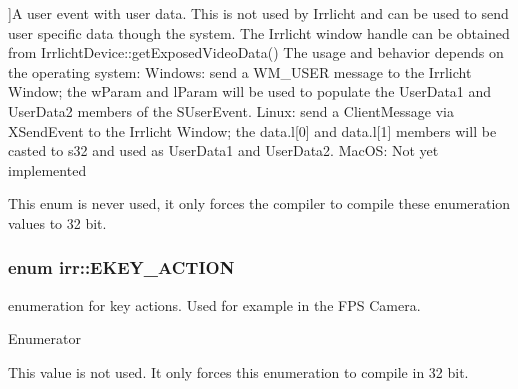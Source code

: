 \begin{Desc}
\begin{description}
{}]A user event with user data. This is not used by Irrlicht and can be used to send user specific data though the system. The Irrlicht \textquotesingle{}window handle\textquotesingle{} can be obtained from Irrlicht\+Device\+::get\+Exposed\+Video\+Data() The usage and behavior depends on the operating system\+: Windows\+: send a W\+M\+\_\+\+U\+S\+ER message to the Irrlicht Window; the w\+Param and l\+Param will be used to populate the User\+Data1 and User\+Data2 members of the S\+User\+Event. Linux\+: send a Client\+Message via X\+Send\+Event to the Irrlicht Window; the data.\+l\mbox{[}0\mbox{]} and data.\+l\mbox{[}1\mbox{]} members will be casted to s32 and used as User\+Data1 and User\+Data2. Mac\+OS\+: Not yet implemented \item[{\em 
E\+G\+U\+I\+E\+T\+\_\+\+F\+O\+R\+C\+E\+\_\+32\+\_\+\+B\+IT\hypertarget{namespaceirr_ac9eed96e06e85ce3c86fcbbbe9e48a0ca736f79f0892ace68311f62939cae5678}{}\label{namespaceirr_ac9eed96e06e85ce3c86fcbbbe9e48a0ca736f79f0892ace68311f62939cae5678}
}]This enum is never used, it only forces the compiler to compile these enumeration values to 32 bit. \end{description}
\end{Desc}
\subsubsection[{\texorpdfstring{E\+K\+E\+Y\+\_\+\+A\+C\+T\+I\+ON}{EKEY\_ACTION}}]{\setlength{\rightskip}{0pt plus 5cm}enum {\bf irr\+::\+E\+K\+E\+Y\+\_\+\+A\+C\+T\+I\+ON}}\hypertarget{namespaceirr_aa9946ac9f3142f9e790ce52d59fd6168}{}\label{namespaceirr_aa9946ac9f3142f9e790ce52d59fd6168}


enumeration for key actions. Used for example in the F\+PS Camera. 

\begin{Desc}
\item[Enumerator]\par
\begin{description}
\item[{\em 
E\+K\+A\+\_\+\+F\+O\+R\+C\+E\+\_\+32\+B\+IT\hypertarget{namespaceirr_aa9946ac9f3142f9e790ce52d59fd6168a27e7067f9bc0bc5143b0bac183ca6c6b}{}\label{namespaceirr_aa9946ac9f3142f9e790ce52d59fd6168a27e7067f9bc0bc5143b0bac183ca6c6b}
}]This value is not used. It only forces this enumeration to compile in 32 bit. \end{description}
\end{Desc}
